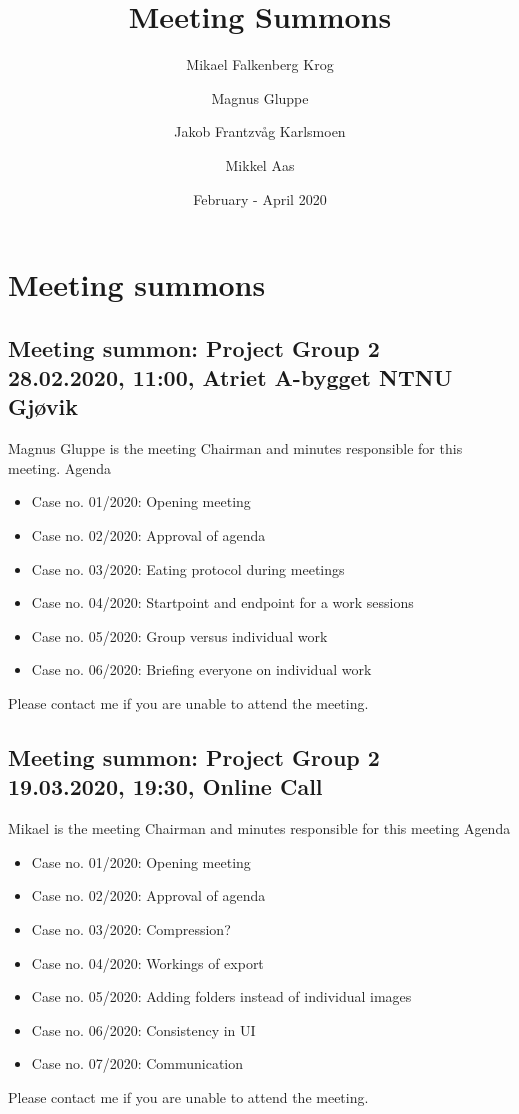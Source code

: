 \documentclass{article}
\title{Meeting Summons}
\author{Mikael Falkenberg Krog \and Magnus Gluppe \and Jakob Frantzvåg Karlsmoen \and Mikkel Aas}
\date{February - April 2020}
\begin{document}
\maketitle
\tableofcontents
\newpage
\section{Meeting summons}
\subsection[Meeting summon: Project Group 2]{Meeting summon: Project Group 2\\ {\large 28.02.2020, 11:00, Atriet A-bygget NTNU Gjøvik}}

Magnus Gluppe is the meeting Chairman and minutes responsible for this meeting.
\newline
\newline
\large Agenda 
\begin{itemize}
    \item Case no. 01/2020:  Opening meeting
    \item Case no. 02/2020:  Approval of agenda
    \item Case no. 03/2020:  Eating protocol during meetings
    \item Case no. 04/2020:  Startpoint and endpoint for a work sessions
    \item Case no. 05/2020:  Group versus individual work
    \item Case no. 06/2020:  Briefing everyone on individual work
\end{itemize}
\newline
\newline
Please contact me if you are unable to attend the meeting.
\newpage

\subsection[Meeting summon: Project Group 2]{Meeting summon: Project Group 2\\ {\large 19.03.2020, 19:30, Online Call}}

Mikael is the meeting Chairman and minutes responsible for this meeting
\newline
\newline
\large Agenda
\begin{itemize}
    \item Case no. 01/2020:  Opening meeting
    \item Case no. 02/2020:  Approval of agenda
    \item Case no. 03/2020:  Compression?
    \item Case no. 04/2020:  Workings of export
    \item Case no. 05/2020:  Adding folders instead of individual images
    \item Case no. 06/2020:  Consistency in UI
    \item Case no. 07/2020:  Communication
\end{itemize}
\newline
\newline
Please contact me if you are unable to attend the meeting.
\newpage
\end{document}
